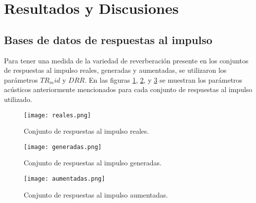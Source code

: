 \section{Resultados y Discusiones}
\subsection{Bases de datos de respuestas al impulso}

Para tener una medida de la variedad de reverberación presente en los conjuntos de respuestas al impulso reales, generadas y aumentadas, se utilizaron los parámetros $TR_mid$ y $DRR$. En las figuras \ref{fig:cloud_reales}, \ref{fig:cloud_generadas}, y \ref{fig:cloud_aumentadas} se muestran los parámetros acústicos anteriormente mencionados para cada conjunto de respuestas al impulso utilizado.  

\begin{figure}[H]
	\centering{}
	\texttt{[image: reales.png]}
	\caption{Conjunto de respuestas al impulso reales.}
	\label{fig:cloud_reales}
\end{figure}

\begin{figure}[H]
	\centering{}
	\texttt{[image: generadas.png]}
	\caption{Conjunto de respuestas al impulso generadas.}
	\label{fig:cloud_generadas}
\end{figure}

\begin{figure}[H]
	\centering{}
	\texttt{[image: aumentadas.png]}
	\caption{Conjunto de respuestas al impulso aumentadas.}
	\label{fig:cloud_aumentadas}
\end{figure}

